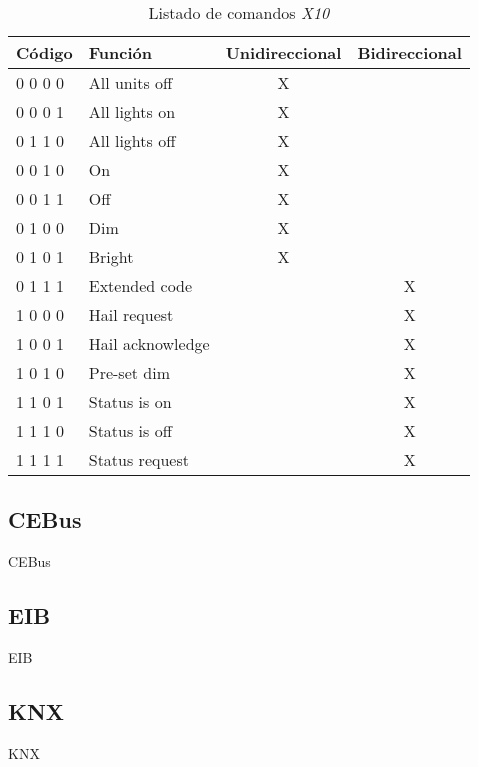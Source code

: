 \begin{table}[!hbt]
    \begin{center}
        \begin{tabular}{|l |l | c | c |}
            \hline
            Código & Función & Unidireccional & Bidireccional \\
            \hline
            0 0 0 0 & All units off & X &  \\
            \hline
            0 0 0 1 & All lights on & X &  \\
            \hline
            0 1 1 0 & All lights off & X &  \\
            \hline
            0 0 1 0 & On & X &  \\
            \hline
            0 0 1 1 & Off & X &  \\
            \hline
            0 1 0 0 & Dim & X &  \\
            \hline
            0 1 0 1 & Bright & X &  \\
            \hline
            0 1 1 1 & Extended code & & X \\
            \hline
            1 0 0 0 & Hail request & & X \\
            \hline
            1 0 0 1 & Hail acknowledge & & X \\
            \hline
            1 0 1 0 & Pre-set dim & & X \\
            \hline
            1 1 0 1 & Status is on & & X \\
            \hline
            1 1 1 0 & Status is off & & X \\
            \hline
            1 1 1 1 & Status request & & X \\
            \hline
        \end{tabular}
        \caption{Listado de comandos \emph{X10}}
    \end{center}
\end{table}

\subsection{CEBus}

CEBus

\subsection{EIB}

EIB

\subsection{KNX}

KNX
